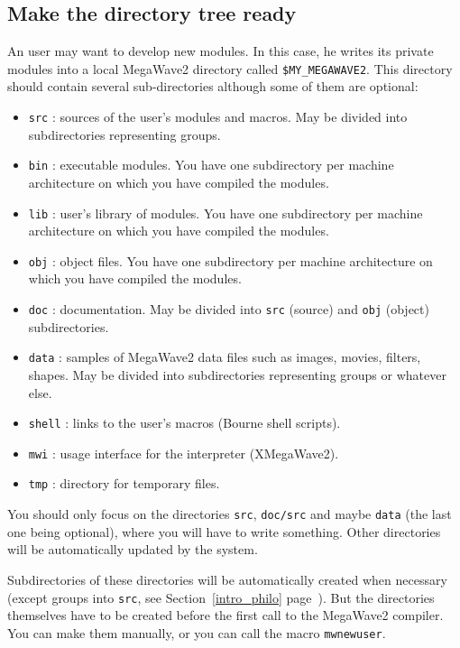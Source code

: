 \subsection{Make the directory tree ready}
\label{install_user_make-dir}

An user may want to develop new modules. 
In this case, he writes its private modules into a local MegaWave2 directory called \verb+$MY_MEGAWAVE2+.
This directory should contain several sub-directories although some of them are optional:
\begin{itemize}
\item \verb+src+ : sources of the user's modules and macros. 
May be divided into subdirectories representing groups.
\item \verb+bin+  : executable modules. You have one subdirectory per machine architecture on which you have compiled the modules.
\item \verb+lib+  : user's library of modules. You have one subdirectory per machine architecture on which you have compiled the modules.
\item \verb+obj+  : object files.  You have one subdirectory per machine architecture on which you have compiled the modules.
\item \verb+doc+  : documentation. May be divided into \verb+src+ (source) and \verb+obj+ (object) subdirectories.
\item \verb+data+  : samples of MegaWave2 data files such as images, movies, filters, 
shapes. May be divided into subdirectories representing groups or whatever else. 
\item \verb+shell+  : links to the user's macros (Bourne shell scripts). 
\item \verb+mwi+  : usage interface for the interpreter (XMegaWave2).
\item \verb+tmp+ : directory for temporary files.
\end{itemize}

You should only focus on the directories \verb+src+, \verb+doc/src+ and maybe \verb+data+ (the last one being optional), where you will have to write something.
Other directories will be automatically updated by the system.

Subdirectories of these directories will be automatically created when necessary (except groups into \verb+src+, see Section~\ref{intro_philo} page~\pageref{intro_philo}).
But the directories themselves have to be created before the first call to the MegaWave2 compiler.
You can make them manually, or you can call the macro \verb+mwnewuser+.









